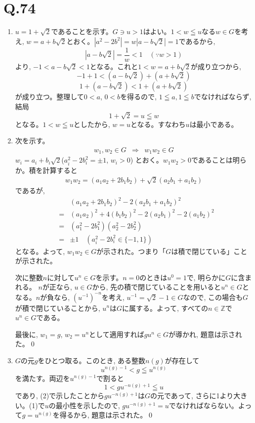 \documentclass[twocolumn]{jbook}
\theoremstyle{definition}
\newcommand{\ben}{\begin{enumerate}}
\newcommand{\een}{\end{enumerate}}
\newcommand{\beqn}{\begin{eqnarray*}}
\newcommand{\eeqn}{\end{eqnarray*}}
\newcommand{\nara}{\Rightarrow}
\newcommand{\mb}{\mathbb}
\renewcommand{\leq}{\leqq}
\begin{document}
\section*{Q.74}
\ben
\item $u=1+\sqrt{2}$であることを示す。$G\ni u>1$はよい。$1<w\leq u$なる$w\in G$を考え, $w=a+b\sqrt{2}$とおく。$|a^2-2b^2| = w|a-b\sqrt{2}|=1$であるから, 
\[|a-b\sqrt{2}| = \dfrac{1}{w} < 1 \quad (\because w>1)\]
より, $-1<a-b\sqrt{2} < 1$となる。これと$1<w=a+b\sqrt{2}$が成り立つから, 
\[-1+1 < (a-b\sqrt{2}) + (a+b\sqrt{2}) \]
\[1+(a-b\sqrt{2}) < 1 + (a+b\sqrt{2})\]
が成り立つ。整理して$0<a$, $0<b$を得るので, $1\leq a, 1\leq b$でなければならず, 結局
\[1+\sqrt{2} = u \leq w\]
となる。$1<w\leq u$としたから, $w=u$となる。すなわち$u$は最小である。
\item 次を示す。
\beqn
w_1, w_2\in G&\nara& w_1w_2\in G
\eeqn
$w_i=a_i+b_i\sqrt{2}$\quad ($a_i^2 - 2b_i^2 = \pm 1$, $w_i>0$) とおく。$w_1w_2 > 0$であることは明らか。積を計算すると
\beqn
w_1w_2 = (a_1a_2 + 2b_1b_2) + \sqrt{2}(a_2b_1 + a_1b_2)
\eeqn
であるが, 
\beqn
&&(a_1a_2 + 2b_1b_2) ^2 - 2(a_2b_1 + a_1b_2)^2\\
&=& (a_1a_2)^2 + 4(b_1b_2)^2 - 2(a_2b_1)^2 - 2(a_1b_2)^2\\
&=&(a_1^2 - 2b_1^2)(a_2^2-2b_2^2)\\
&=&\pm 1 \quad (a_i^2-2b_i^2 \in \{ -1,1 \})
\eeqn
となる。よって, $w_1w_2\in G$が示された。つまり「$G$は積で閉じている」ことが示された。\par
次に整数$n$に対して$u^{n}\in G$を示す。$n=0$のときは$u^{0}=1$で, 明らかに$G$に含まれる。
$n$が正なら, $u\in G$から, 先の積で閉じていることを用いると$u^{n}\in G$となる。$n$が負なら, $(u^{-1})^{-n}$を考え, $u^{-1} = \sqrt{2} -1 \in G$なので, この場合も$G$が積で閉じていることから, $u^n$は$G$に属する。よって, すべての$n \in \mb{Z}$で$u^n\in G$である。\par
最後に, $w_1=g$, $w_2=u^n$として適用すれば$gu^n\in G$が導かれ, 題意は示された。\qed
\item $G$の元$g$をひとつ取る。このとき, ある整数$n(g)$が存在して
\[u^{n(g)-1} < g \leq u^{n(g)}\]
を満たす。両辺を$u^{n(g)-1}$で割ると
\[1 < gu^{-n(g)+1} \leq u\]
であり, (2)で示したことから$gu^{-n(g)+1}$は$G$の元であって, さらに1より大きい。(1)で$u$の最小性を示したので, $gu^{-n(g)+1} = u$でなければならない。よって$g=u^{n(g)}$を得るから, 題意は示された。\qed


\een
\end{document}
